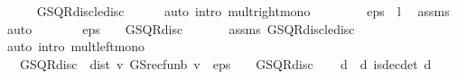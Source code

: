 \begin{isabellebody}
\ \ \ \ \isamarkupfalse%
\ GS{\isacharunderscore}{\kern0pt}QR{\isacharunderscore}{\kern0pt}disc{\isacharunderscore}{\kern0pt}le{\isacharunderscore}{\kern0pt}disc\isanewline
\ \ \ \ \isamarkupfalse%
\ {\isacharparenleft}{\kern0pt}auto\ intro{\isacharbang}{\kern0pt}{\isacharcolon}{\kern0pt}\ mult{\isacharunderscore}{\kern0pt}right{\isacharunderscore}{\kern0pt}mono{\isacharparenright}{\kern0pt}\isanewline
\ \ \isamarkupfalse%
\ \isamarkupfalse%
\ {\isachardoublequoteopen}{\isasymdots}\ {\isacharless}{\kern0pt}\ \ eps\ {\isacharasterisk}{\kern0pt}\ {\isacharparenleft}{\kern0pt}{}{\isacharminus}{\kern0pt}l{\isacharparenright}{\kern0pt}{\isachardoublequoteclose}\ \isamarkupfalse%
\ assms\ \isamarkupfalse%
\ auto\isanewline
\ \ \isamarkupfalse%
\ \isamarkupfalse%
\ {\isachardoublequoteopen}{\isasymdots}\ {\isasymle}\ eps\ {\isacharasterisk}{\kern0pt}\ {\isacharparenleft}{\kern0pt}{}\ {\isacharminus}{\kern0pt}\ GS{\isachardot}{\kern0pt}QR{\isacharunderscore}{\kern0pt}disc{\isacharparenright}{\kern0pt}{\isachardoublequoteclose}\ \isanewline
\ \ \ \ \isamarkupfalse%
\ assms\ GS{\isacharunderscore}{\kern0pt}QR{\isacharunderscore}{\kern0pt}disc{\isacharunderscore}{\kern0pt}le{\isacharunderscore}{\kern0pt}disc\isanewline
\ \ \ \ \isamarkupfalse%
\ {\isacharparenleft}{\kern0pt}auto\ intro{\isacharbang}{\kern0pt}{\isacharcolon}{\kern0pt}\ mult{\isacharunderscore}{\kern0pt}left{\isacharunderscore}{\kern0pt}mono{\isacharparenright}{\kern0pt}\isanewline
\ \ \isamarkupfalse%
\ \isamarkupfalse%
\ {\isachardoublequoteopen}{}\ {\isacharasterisk}{\kern0pt}\ GS{\isachardot}{\kern0pt}QR{\isacharunderscore}{\kern0pt}disc\ {\isacharasterisk}{\kern0pt}\ dist\ v\ {\isacharparenleft}{\kern0pt}GS{\isacharunderscore}{\kern0pt}rec{\isacharunderscore}{\kern0pt}fun\isactrlsub b\ v{\isacharparenright}{\kern0pt}\ {\isacharless}{\kern0pt}\ eps\ {\isacharasterisk}{\kern0pt}\ {\isacharparenleft}{\kern0pt}{}\ {\isacharminus}{\kern0pt}\ GS{\isachardot}{\kern0pt}QR{\isacharunderscore}{\kern0pt}disc{\isacharparenright}{\kern0pt}{\isachardoublequoteclose}\isacommand{{\isachardot}{\kern0pt}}\isamarkupfalse%
\isanewline
{}\isamarkupfalse%
\isanewline
\ \ \isamarkupfalse%
\ d\ \ d{\isacharcolon}{\kern0pt}\ {\isachardoublequoteopen}is{\isacharunderscore}{\kern0pt}dec{\isacharunderscore}{\kern0pt}det\ d{\isachardoublequoteclose}\isanewline

\end{isabellebody}
